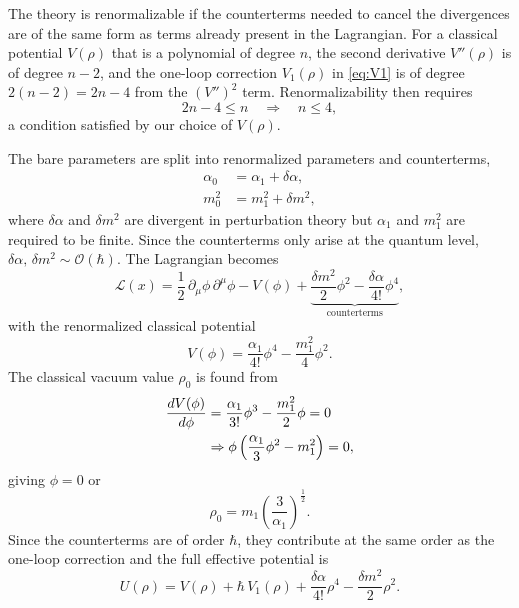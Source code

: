The theory is renormalizable if the counterterms needed to cancel the
divergences are of the same form as terms already present in the
Lagrangian. For a classical potential $V(\rho)$ that is a polynomial of
degree $n$, the second derivative $V''(\rho)$ is of degree $n-2$, and the
one-loop correction $V_1(\rho)$ in \eqref{eq:V1} is of degree $2(n-2) =
2n-4$ from the $(V'')^2$ term. Renormalizability then requires
\begin{equation}
    2n - 4 \leq n \quad\Rightarrow\quad n \leq 4,
\end{equation}
a condition satisfied by our choice of $V(\rho)$.

The bare parameters are split into renormalized parameters and
counterterms,
\begin{align}
    \alpha_0 &= \alpha_1 + \delta\alpha, \\
    m_0^2 &= m_1^2 + \delta m^2,
\end{align}
where $\delta\alpha$ and $\delta m^2$ are divergent in perturbation theory
but $\alpha_1$ and $m_1^2$ are required to be finite. Since the
counterterms only arise at the quantum level, $\delta\alpha,\,\delta m^2
\sim \mathcal{O}(\hbar)$. The Lagrangian becomes
\begin{equation}
    \mathcal{L}(x) = \frac{1}{2}\,\partial_\mu\phi\,\partial^\mu\phi
    - V(\phi)
    + \underbrace{\frac{\delta m^2}{2}\phi^2
    - \frac{\delta\alpha}{4!}\phi^4}_{\text{counterterms}},
\end{equation}
with the renormalized classical potential
\begin{equation}
    V(\phi) = \frac{\alpha_1}{4!}\phi^4 - \frac{m_1^2}{4}\phi^2.
\end{equation}
The classical vacuum value $\rho_0$ is found from
\begin{align}
    \frac{dV(\phi)}{d\phi} &= \frac{\alpha_1}{3!}\phi^3
    - \frac{m_1^2}{2}\phi = 0 \notag\\
    &\Rightarrow \phi\left(\frac{\alpha_1}{3}\phi^2 - m_1^2\right) = 0,
\end{align}
giving $\phi = 0$ or
\begin{equation}
    \rho_0 = m_1\left(\frac{3}{\alpha_1}\right)^{\frac{1}{2}}.
\end{equation}
Since the counterterms are of order $\hbar$, they contribute at the same
order as the one-loop correction and the full effective potential is
\begin{equation}
    U(\rho) = V(\rho) + \hbar\,V_1(\rho)
    + \frac{\delta\alpha}{4!}\rho^4 - \frac{\delta m^2}{2}\rho^2.
\end{equation}
